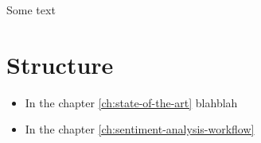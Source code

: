 Some text \cite{masse2011rest} \Blindtext \cite{rizzo2015progettazione}
\Blindtext

\clearpage

\section{Structure}
\blindtext

\begin{itemize}
	\item 
	In the chapter \ref{ch:state-of-the-art} blahblah
	\item 
	In the chapter \ref{ch:sentiment-analysis-workflow} \blindtext

\end{itemize}